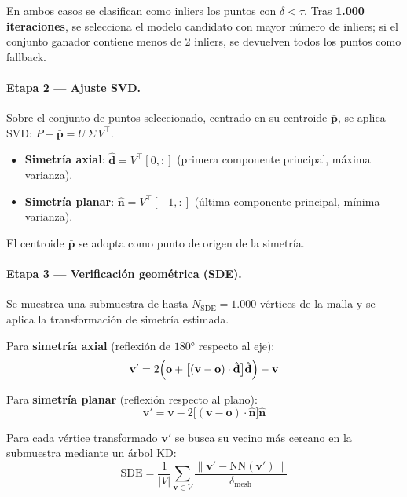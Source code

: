 En ambos casos se clasifican como inliers los puntos con $\delta < \tau$. Tras
\textbf{1.000 iteraciones}, se selecciona el modelo candidato con mayor número de
inliers; si el conjunto ganador contiene menos de 2 inliers, se devuelven todos
los puntos como fallback.

\paragraph{Etapa 2 — Ajuste SVD.}
Sobre el conjunto de puntos seleccionado, centrado en su centroide $\bar{\mathbf{p}}$,
se aplica SVD: $P - \bar{\mathbf{p}} = U\,\Sigma\,V^\top$.

\begin{itemize}
    \item \textbf{Simetría axial}: $\hat{\mathbf{d}} = V^\top[0,:]$
          (primera componente principal, máxima varianza).
    \item \textbf{Simetría planar}: $\hat{\mathbf{n}} = V^\top[-1,:]$
          (última componente principal, mínima varianza).
\end{itemize}

El centroide $\bar{\mathbf{p}}$ se adopta como punto de origen de la simetría.

\paragraph{Etapa 3 — Verificación geométrica (SDE).}
Se muestrea una submuestra de hasta $N_{\text{SDE}} = 1.000$ vértices de la malla
y se aplica la transformación de simetría estimada.

Para \textbf{simetría axial} (reflexión de $180°$ respecto al eje):
\begin{equation}
    \mathbf{v}' = 2\Bigl(\mathbf{o} +
        \bigl[(\mathbf{v} - \mathbf{o})\cdot\hat{\mathbf{d}}\bigr]
        \hat{\mathbf{d}}\Bigr) - \mathbf{v}
    \label{eq:sde_axis}
\end{equation}

Para \textbf{simetría planar} (reflexión respecto al plano):
\begin{equation}
    \mathbf{v}' = \mathbf{v} -
        2\bigl[(\mathbf{v} - \mathbf{o})\cdot\hat{\mathbf{n}}\bigr]\hat{\mathbf{n}}
    \label{eq:sde_plane}
\end{equation}

Para cada vértice transformado $\mathbf{v}'$ se busca su vecino más cercano en la
submuestra mediante un árbol KD:
\begin{equation}
    \text{SDE} = \frac{1}{|V|}\sum_{\mathbf{v} \in V}
        \frac{\|\mathbf{v}' - \mathrm{NN}(\mathbf{v}')\|}{\delta_{\text{mesh}}}
    \label{eq:sde}
\end{equation}


